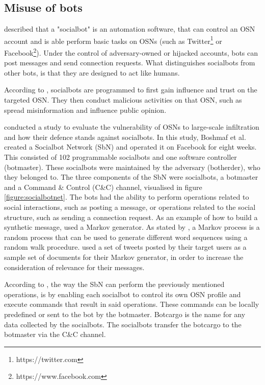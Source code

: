     \subsection{Misuse of bots}
    \label{subsection:MisuseOfBots}
      

        \textcite[93]{SocialbotNetwork} described that a "socialbot" is an automation software, that can control an OSN account and is able  perform basic tasks on OSNs (such as Twitter\footnote{https://twitter.com} or Facebook\footnote{https://www.facebook.com}). Under the control of adversary-owned or hijacked accounts, bots can post messages and send connection requests. What distinguishes socialbots from other bots, is that they are designed to act like humans.
        

        According to \textcite[2]{ReverseEngineeringSocialbot}, socialbots are programmed to first gain influence and trust on the targeted OSN. They then conduct malicious activities on that OSN, such as spread misinformation and influence public opinion.
        
        \textcite[556-557, 560]{DesignAnalysis} conducted a study to evaluate the vulnerability of OSNs to large-scale infiltration and how their defence stands against socialbots. In this study, Boshmaf et al. created a Socialbot Network (SbN) and operated it on Facebook for eight weeks. This consisted of 102 programmable socialbots and one software controller (botmaster). These socialbots were maintained by the adversary (botherder), who they belonged to. The three components of the SbN were socialbots, a botmaster and a Command \& Control (C\&C) channel, visualised in figure \ref{figure:socialbotnet}. The bots had the ability to perform operations related to social interactions, such as posting a message, or operations related to the social structure, such as sending a connection request.  As an example of how to build a synthetic message, \textcite[4]{ReverseEngineeringSocialbot} used a Markov generator. As stated by \textcite[116]{Markov}, a Markov process is a random process that can be used to generate different word sequences using a random walk procedure. \textcite[4]{ReverseEngineeringSocialbot} used a set of tweets posted by their target users as a sample set of documents for their Markov generator, in order to increase the consideration of relevance for their messages. 
        
        According to \textcite[560]{DesignAnalysis}, the way the SbN can perform the previously mentioned operations, is by enabling each socialbot to control its own OSN profile and execute commands that result in said operations. These commands can be locally predefined or sent to the bot by the botmaster. Botcargo is the name for any data collected by the socialbots. The socialbots transfer the botcargo to the botmaster via the C\&C channel.
        
